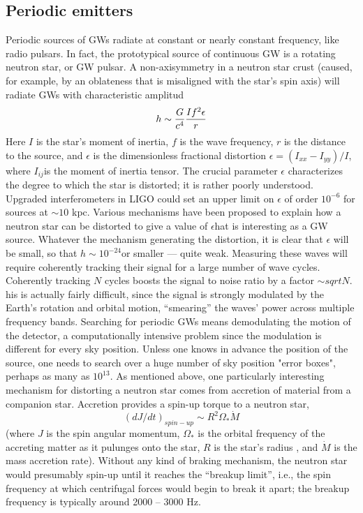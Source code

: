 \documentclass[binding=0.6cm, LaM]{sapthesis}
\begin{document}
\subsection{Periodic emitters}
Periodic sources of GWs radiate at constant or nearly constant frequency, like radio pulsars. 
In fact, the prototypical source of continuous GW is a rotating neutron star, or GW pulsar. A non-axisymmetry in a neutron star crust (caused, for example, by an oblateness that is misaligned with 
the star’s spin axis) will radiate GWs with characteristic amplitud
\begin{equation}
 h \sim {G \over c^4}{{If^2\epsilon}\over{r}}
\end{equation}
Here $I$ is the star's moment of inertia, $f$ is the wave frequency, $r$ is the distance to the source, and $\epsilon$ is the dimensionless fractional distortion $\epsilon = (I_{xx}-I_{yy})/I$, 
where $I_{ij}$is the moment of inertia tensor. The crucial parameter $\epsilon$ characterizes the degree to which the star is distorted; it is rather poorly understood. 
Upgraded interferometers in LIGO could set an upper limit on  $\epsilon$ of order $10^{-6}$ for sources at $\sim10$ kpc. 
Various mechanisms have been proposed to explain how a neutron star can be distorted to give a value of $\epsilon$hat is interesting as a GW source.
Whatever the mechanism generating the distortion, it is clear that  $\epsilon$ will be small,
so that $h \sim 10^{-24}$or smaller — quite weak. Measuring these waves will require
coherently tracking their signal for a large number of wave cycles. Coherently tracking $N$ cycles boosts the signal to noise ratio by a factor $\sim sqrt{N}$.
his is actually fairly
 difficult, since the signal is strongly modulated by the Earth’s rotation and orbital
motion, “smearing” the waves’ power across multiple frequency bands. Searching for
periodic GWs means demodulating the motion of the detector, a computationally
intensive problem since the modulation is different for every sky position. Unless
one knows in advance the position of the source, one needs to search over a huge number of sky position "error boxes", perhaps as many as $10^13$.
As mentioned above, one particularly interesting mechanism for distorting a neutron star comes from accretion of material from a companion star. Accretion provides a spin-up torque to a neutron star,
\begin{equation}
(dJ/dt)_{spin-up} \sim R^2\Omega_* \dot M
\end{equation}
(where $J$  is the spin angular momentum, $\Omega_* $ is the orbital frequency of the accreting matter as it pulunges onto the star, $R$ is the star's radius , and $\dot M$ 
is the mass accretion rate).
Without any kind of braking mechanism, the neutron star would presumably spin-up until it reaches the “breakup limit”, i.e., the spin frequency at which centrifugal forces would begin to break it 
apart; the breakup frequency is typically around 2000 – 3000 Hz.
\end{document}
